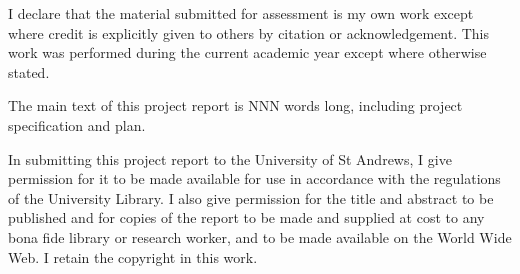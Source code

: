 


I declare that the material submitted for assessment is my own work except
where credit is explicitly given to others by citation or acknowledgement. This
work was performed during the current academic year except where otherwise
stated.

The main text of this project report is NNN words long, including project
specification and plan.

In submitting this project report to the University of St Andrews, I give
permission for it to be made available for use in accordance with the
regulations of the University Library. I also give permission for the title and
abstract to be published and for copies of the report to be made and supplied
at cost to any bona fide library or research worker, and to be made available
on the World Wide Web. I retain the copyright in this work.


